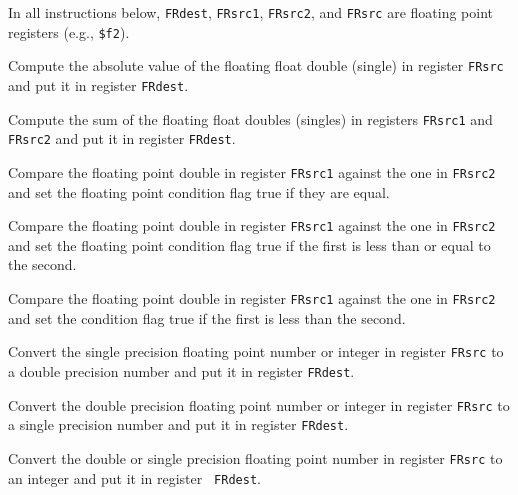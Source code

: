 In all instructions below, {\tt FRdest}, {\tt FRsrc1}, {\tt FRsrc2},
and {\tt FRsrc} are floating point registers (e.g., {\tt \$f2}).

Compute the absolute value of the floating float double (single) in
register {\tt FRsrc} and put it in register {\tt FRdest}.

Compute the sum of the floating float doubles (singles) in registers
{\tt FRsrc1} and {\tt FRsrc2} and put it in register {\tt FRdest}.

Compare the floating point double in register {\tt FRsrc1} against
the one in {\tt FRsrc2} and set the floating point condition flag
true if they are equal.

Compare the floating point double in register {\tt FRsrc1} against
the one in {\tt FRsrc2} and set the floating point condition flag
true if the first is less than or equal to the second.

Compare the floating point double in register {\tt FRsrc1} against
the one in {\tt FRsrc2} and set the condition flag true if the first
is less than the second.

Convert the single precision floating point number or integer in
register {\tt FRsrc} to a double precision number and put it in
register {\tt FRdest}.

Convert the double precision floating point number or integer in
register {\tt FRsrc} to a single precision number and put it in
register {\tt FRdest}.

Convert the double or single precision floating point number in
register {\tt FRsrc} to an integer and put it in register {\tt
FRdest}.

